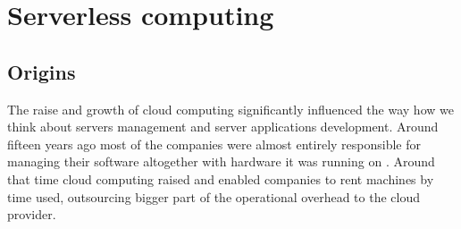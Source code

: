 \chapter{Serverless computing}



\section{Origins}

The raise and growth of cloud computing significantly influenced the way how we think about servers management and server applications development. Around fifteen years ago most of the companies were almost entirely responsible for managing their software altogether with hardware it was running on \cite{RobertsChapin2017}. Around that time cloud computing raised and enabled companies to rent machines by time used, outsourcing bigger part of the operational overhead to the cloud provider. 

